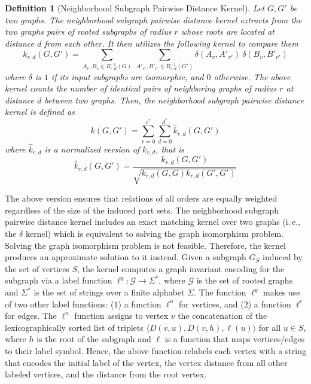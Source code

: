 \documentclass[twoside,11pt]{article}
\newcommand{\ie}{i.\,e., }
\newtheorem{definition}{Definition}
\begin{document}
\begin{definition}[Neighborhood Subgraph Pairwise Distance Kernel]
	Let $G,G'$ be two graphs.
	The neighborhood subgraph pairwise distance kernel extracts from the two graphs pairs of rooted subgraphs of radius $r$ whose roots are located at distance $d$ from each other.
	It then utilizes the following kernel to compare them
	\begin{equation}
	    k_{r,d}(G, G') = \sum_{A_v, B_v \in R_{r,d}^{-1}(G)} \ \sum_{A'_{v'}, B'_{v'} \in R_{r,d}^{-1}(G')} \delta(A_v, A'_{v'}) \ \delta(B_v, B'_{v'})
	\end{equation}
	where $\delta$ is $1$ if its input subgraphs are isomorphic, and $0$ otherwise.
	The above kernel counts the number of identical pairs of neighboring graphs of radius $r$ at distance $d$ between two graphs.
	Then, the neighborhood subgraph pairwise distance kernel is defined as
	\begin{equation}
	    k(G, G') = \sum_{r=0}^{r^*} \sum_{d=0}^{d^*} \hat{k}_{r,d}(G, G')
	\end{equation}
	where $\hat{k}_{r,d}$ is a normalized version of $k_{r,d}$, that is
	\begin{equation}
	    \hat{k}_{r,d}(G,G') = \frac{k_{r,d}(G,G')}{\sqrt{k_{r,d}(G,G) k_{r,d}(G',G')}}
	\end{equation}
\end{definition}
The above version ensures that relations of all orders are equally weighted regardless of the size of the induced part sets.
The neighborhood subgraph pairwise distance kernel includes an exact matching kernel over two graphs (\ie the $\delta$ kernel) which is equivalent to solving the graph isomorphism problem.
Solving the graph isomorphism problem is not feasible.
Therefore, the kernel produces an approximate solution to it instead.
Given a subgraph $G_S$ induced by the set of vertices $S$, the kernel computes a graph invariant encoding for the subgraph via a label function $\ell^g : \mathcal{G} \rightarrow \Sigma^*$, where $\mathcal{G}$ is the set of rooted graphs and $\Sigma^*$ is the set of strings over a finite alphabet $\Sigma$.
The function $\ell^g$ makes use of two other label functions: ($1$) a function $\ell^n$ for vertices, and ($2$) a function $\ell^e$ for edges.
The $\ell^n$ function assigns to vertex $v$ the concatenation of the lexicographically sorted list of triplets $\langle D(v,u), D(v,h), \ell(u) \rangle$ for all $u \in S$, where $h$ is the root of the subgraph and $\ell$ is a function that maps vertices/edges to their label symbol.
Hence, the above function relabels each vertex with a string that encodes the initial label of the vertex, the vertex distance from all other labeled vertices, and the distance from the root vertex.
\end{document}
